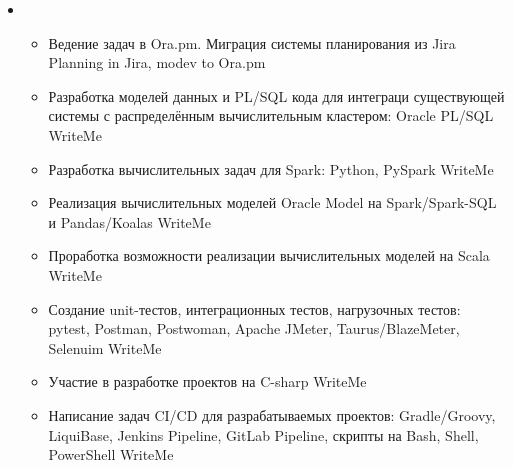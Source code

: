 \documentclass[11pt,a4paper,sans]{moderncv}        %
\begin{document}
{\begin{itemize}
\begin{itemize}
				{Проработка архитектуры прикладного программного обеспечения и взаимодействия компонент разрабатываемого решения}
				{WriteMe}
			\item {}
				{Участие в технических совещаниях с заказчиком, участие в защите решения у заказчика, написание технической документации}
				{WriteMe}
		\end{itemize}
		\item {}
		\begin{itemize}
			\item {}
				{Ведение задач в Ora.pm. Миграция системы планирования из Jira}
				{Planning in Jira, modev to Ora.pm}
			\item {}
				{Разработка моделей данных и PL/SQL кода для интеграци существующей системы с распределённым вычислительным кластером: Oracle PL/SQL}
				{WriteMe}
			\item {}
				{Разработка вычислительных задач для Spark: Python, PySpark}
				{WriteMe}
			\item {}
				{Реализация вычислительных моделей Oracle Model на Spark/Spark-SQL и Pandas/Koalas}
				{WriteMe}
			\item {}
				{Проработка возможности реализации вычислительных моделей на Scala}
				{WriteMe}
			\item {}
				{Создание unit-тестов, интеграционных тестов, нагрузочных тестов: pytest, Postman, Postwoman, Apache JMeter, Taurus/BlazeMeter, Selenuim}
				{WriteMe}
			\item {}
				{Участие в разработке проектов на C-sharp}
				{WriteMe}
			\item {}
				{Написание задач CI/CD для разрабатываемых проектов: Gradle/Groovy, LiquiBase, Jenkins Pipeline, GitLab Pipeline, скрипты на Bash, Shell, PowerShell}
				{WriteMe}	
		\end{itemize}
	\end{itemize}
}
\end{document}
